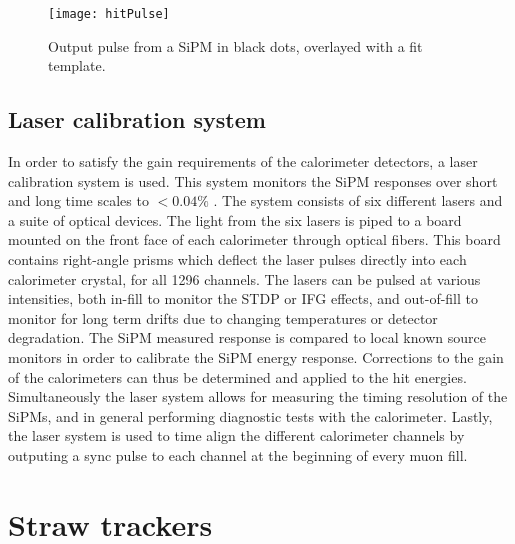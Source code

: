 \begin{figure}[]
\centering
        \texttt{[image: hitPulse]}
\caption[SiPM pulse]{Output pulse from a SiPM in black dots, overlayed with a fit template.}
\label{fig:calopulse}
\end{figure}


\subsection{Laser calibration system}
\label{sub:LaserCalibrationSystem}


In order to satisfy the gain requirements of the calorimeter detectors, a laser calibration system is used. This system monitors the SiPM responses over short and long time scales to $< 0.04\%$ \cite{Anastasi:2017sos}. The system consists of six different lasers and a suite of optical devices. The light from the six lasers is piped to a board mounted on the front face of each calorimeter through optical fibers. This board contains right-angle prisms which deflect the laser pulses directly into each calorimeter crystal, for all 1296 channels. The lasers can be pulsed at various intensities, both in-fill to monitor the STDP or IFG effects, and out-of-fill to monitor for long term drifts due to changing temperatures or detector degradation. The SiPM measured response is compared to local known source monitors in order to calibrate the SiPM energy response. Corrections to the gain of the calorimeters can thus be determined and applied to the hit energies. Simultaneously the laser system allows for measuring the timing resolution of the SiPMs, and in general performing diagnostic tests with the calorimeter. Lastly, the laser system is used to time align the different calorimeter channels by outputing a sync pulse to each channel at the beginning of every muon fill.






\section{Straw trackers}
\label{sec:StrawTrackers}

